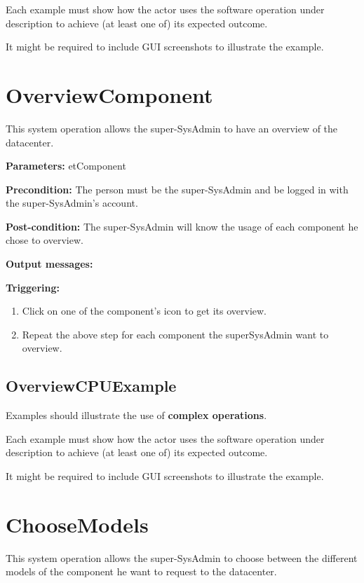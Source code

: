 Each example must show how the actor uses the software operation under
description to achieve (at least one of) its expected outcome.

It might be required to include GUI screenshots to illustrate the example.



\section{OverviewComponent}
\label{operation:overviewcomponent}
This system operation allows the super-SysAdmin to have an overview of the
datacenter.

\begin{description}

\item \textbf{Parameters:} etComponent
\item \textbf{Precondition:} The person must be the super-SysAdmin and be logged
in with the super-SysAdmin's account.
\item \textbf{Post-condition:} The super-SysAdmin will know the usage of each
component he chose to overview.
\item \textbf{Output messages:}

\item \textbf{Triggering:}
\begin{enumerate}
\item Click on one of the component's icon to get its overview.
\item Repeat the above step for each component the superSysAdmin want to
overview.
\end{enumerate}

 
\end{description}

\subsection{OverviewCPUExample}
Examples should illustrate the use of \textbf{complex operations}.

Each example must show how the actor uses the software operation under
description to achieve (at least one of) its expected outcome.

It might be required to include GUI screenshots to illustrate the example.









\section{ChooseModels}
\label{operation:choosemodels}
This system operation allows the super-SysAdmin to choose between the different
models of the component he want to request to the datacenter.

